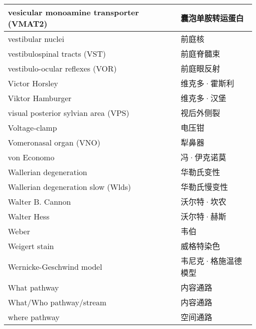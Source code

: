 \begin{longtable}{lll}
	\midrule
	vesicular monoamine transporter (VMAT2)   && 囊泡单胺转运蛋白  \\
	
	\midrule
	vestibular nuclei   && 前庭核  \\
	
	\midrule
	vestibulospinal tracts (VST)   && 前庭脊髓束  \\
	
	\midrule
	vestibulo-ocular reflexes (VOR)   && 前庭眼反射  \\
	
	\midrule
	Victor Horsley   && 维克多·霍斯利  \\
	
	\midrule
	Viktor Hamburger   && 维克多·汉堡  \\
	
	\midrule
	visual posterior sylvian area (VPS)   && 视后外侧裂  \\
	
	\midrule
	Voltage-clamp  && 电压钳  \\
	
	\midrule
	Vomeronasal organ (VNO)  && 犁鼻器  \\
	
	\midrule
	von Economo   && 冯·伊克诺莫  \\
	
	\midrule
	Wallerian degeneration  && 华勒氏变性  \\
	
	\midrule
	Wallerian degeneration slow (Wlds) && 华勒氏慢变性  \\
	
	\midrule
	Walter B. Cannon  && 沃尔特·坎农  \\
	
	\midrule
	Walter Hess  && 沃尔特·赫斯  \\
	
	\midrule
	Weber  && 韦伯  \\
	
	\midrule
	Weigert stain  && 威格特染色  \\
	
	\midrule
	Wernicke-Geschwind model  && 韦尼克·格施温德模型  \\
	
	\midrule
	What pathway  && 内容通路  \\
	
	\midrule
	What/Who pathway/stream  && 内容通路  \\
	
	\midrule
	where pathway && 空间通路  \\
	

\end{longtable}
